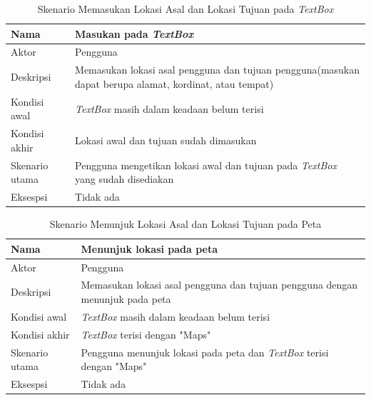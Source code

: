 \begin{table}[H]
	\centering
		\begin{tabular}{ |p{2cm}|p{10cm}| }
			\hline
			Nama &  Masukan pada \textit{TextBox}\\ \hline
			Aktor & Pengguna  \\ \hline
			Deskripsi & Memasukan lokasi asal pengguna dan tujuan pengguna(masukan dapat berupa alamat, kordinat, atau tempat) \\ \hline
			Kondisi awal & \textit{TextBox} masih dalam keadaan belum terisi \\ \hline
			Kondisi akhir & Lokasi awal dan tujuan sudah dimasukan   \\ \hline
			Skenario utama & Pengguna mengetikan lokasi awal dan tujuan pada \textit{TextBox} yang sudah disediakan \\ \hline
			Eksespsi & Tidak ada  \\ 
			\hline
		\end{tabular}
	\caption{Skenario Memasukan Lokasi Asal dan Lokasi Tujuan pada \textit{TextBox}}
	\label{tab:masukanLokasi}
\end{table}

\begin{table}[H]
	\centering
		\begin{tabular}{ |p{2cm}|p{10cm}| }
			\hline
			Nama &  Menunjuk lokasi pada peta\\ \hline
			Aktor & Pengguna  \\ \hline
			Deskripsi & Memasukan lokasi asal pengguna dan tujuan pengguna dengan menunjuk pada peta \\ \hline
			Kondisi awal & \textit{TextBox} masih dalam keadaan belum terisi \\ \hline
			Kondisi akhir & \textit{TextBox} terisi dengan "Maps"   \\ \hline
			Skenario utama & Pengguna menunjuk lokasi pada peta dan \textit{TextBox} terisi dengan "Maps" \\ \hline
			Eksespsi & Tidak ada  \\ 
			\hline
		\end{tabular}
	\caption{Skenario Menunjuk Lokasi Asal dan Lokasi Tujuan pada Peta}
	\label{tab:lokasiPeta}
\end{table}

